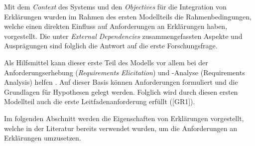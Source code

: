 \smallskip

Mit dem \textit{Context} des Systems und den \textit{Objectives} für die Integration von Erklärungen wurden im Rahmen des ersten Modellteils die Rahmenbedingungen, welche einen direkten Einfluss auf Anforderungen an Erklärungen haben, vorgestellt. Die unter \textit{External Dependencies} zusammengefassten Aspekte und Ausprägungen sind folglich die Antwort auf die erste Forschungsfrage.

Als Hilfsmittel kann dieser erste Teil des Modells vor allem bei der Anforderungserhebung (\textit{Requirements Elicitation}) und -Analyse (Requirements Analysis) helfen \cite{schneider2012abenteuer}. Auf dieser Basis können Anforderungen formuliert und die Grundlagen für Hypothesen gelegt werden. Folglich wird durch diesen ersten Modellteil auch die erste Leitfadenanforderung erfüllt ([GR1]).

\smallskip

Im folgenden Abschnitt werden die Eigenschaften von Erklärungen vorgestellt, welche in der Literatur bereits verwendet wurden, um die Anforderungen an Erklärungen umzusetzen.
